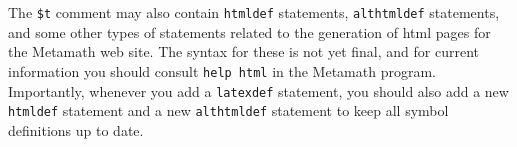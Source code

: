 The \texttt{\$t} comment may also contain \texttt{htmldef}
statements, \texttt{althtmldef}
statements, and some other types of
statements related to the generation of {\sc html} pages for the
Metamath web site. The
syntax for these is not yet final, and for current information you
should consult \texttt{help html} in the Metamath program.  Importantly,
whenever you add a \texttt{latexdef} statement, you should also add a
new \texttt{htmldef} statement and a new \texttt{althtmldef} statement
to keep all symbol definitions up to date.




